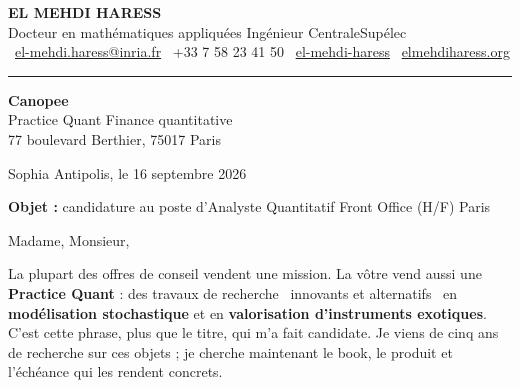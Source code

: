 \documentclass[10pt,a4paper]{article}
\begin{document}
{\headingfont\bfseries\fontsize{20}{23}\selectfont EL MEHDI HARESS}\\[0.7ex]
{\headingfont\fontsize{10.5}{13}\selectfont\color{accent}%
Docteur en mathématiques appliquées \textbar{} Ingénieur CentraleSupélec}\\[1.0ex]
{\small
\faEnvelope[regular]~\href{mailto:el-mehdi.haress@inria.fr}{el-mehdi.haress@inria.fr}\quad
\faPhone*~+33 7 58 23 41 50\quad
\faLinkedin~\href{https://www.linkedin.com/in/el-mehdi-haress-67750b3aa/}{el-mehdi-haress}\quad
\faGlobe~\href{https://elmehdiharess.org}{elmehdiharess.org}
}

\vspace{0.4ex}
{\color{rulegray}\rule{\linewidth}{0.7pt}}

\vspace{1.2ex}

\begin{minipage}[t]{0.5\textwidth}
\vspace{0pt}\raggedright\small
\textbf{Canopee}\\
Practice Quant \textemdash{} Finance quantitative\\
77 boulevard Berthier, 75017 Paris
\end{minipage}\hfill
\begin{minipage}[t]{0.42\textwidth}
\vspace{0pt}\raggedleft\small
Sophia Antipolis, le 16 septembre 2026
\end{minipage}

\vspace{2.2ex}

{\small\textbf{Objet :} candidature au poste d'Analyste Quantitatif Front Office (H/F) \textemdash{} Paris}

\vspace{2.2ex}

Madame, Monsieur,

La plupart des offres de conseil vendent une mission. La vôtre vend aussi une \textbf{Practice Quant} : des
travaux de recherche \og~innovants et alternatifs~\fg{} en \textbf{modélisation stochastique} et en
\textbf{valorisation d'instruments exotiques}. C'est cette phrase, plus que le titre, qui m'a fait
candidate. Je viens de cinq ans de recherche sur ces objets ; je cherche maintenant le book, le produit et
l'échéance qui les rendent concrets.
\end{document}
